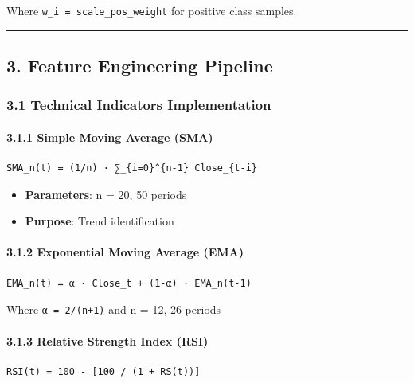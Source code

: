 Where \texttt{w\_i\ =\ scale\_pos\_weight} for positive class samples.

\begin{center}\rule{0.5\linewidth}{0.5pt}\end{center}

\subsection{3. Feature Engineering
Pipeline}\label{feature-engineering-pipeline}

\subsubsection{3.1 Technical Indicators
Implementation}\label{technical-indicators-implementation}

\paragraph{3.1.1 Simple Moving Average
(SMA)}\label{simple-moving-average-sma}

\begin{verbatim}
SMA_n(t) = (1/n) · ∑_{i=0}^{n-1} Close_{t-i}
\end{verbatim}

\begin{itemize}
\tightlist
\item
  \textbf{Parameters}: n = 20, 50 periods
\item
  \textbf{Purpose}: Trend identification
\end{itemize}

\paragraph{3.1.2 Exponential Moving Average
(EMA)}\label{exponential-moving-average-ema}

\begin{verbatim}
EMA_n(t) = α · Close_t + (1-α) · EMA_n(t-1)
\end{verbatim}

Where \texttt{α\ =\ 2/(n+1)} and n = 12, 26 periods

\paragraph{3.1.3 Relative Strength Index
(RSI)}\label{relative-strength-index-rsi}

\begin{verbatim}
RSI(t) = 100 - [100 / (1 + RS(t))]
\end{verbatim}

